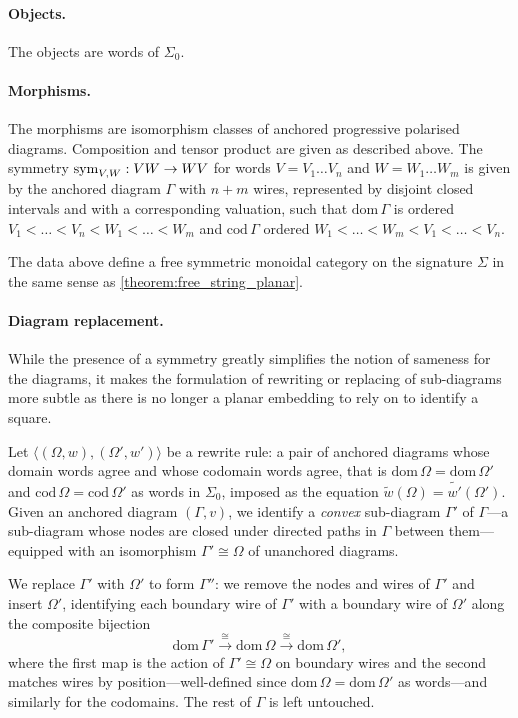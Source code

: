\paragraph{Objects.} The objects are words of $\Sigma_0$.
\paragraph{Morphisms.} The morphisms are isomorphism classes of anchored progressive polarised diagrams.
Composition and tensor product are given as described above.
The symmetry $\operatorname{sym}_{V,W} : VW \to WV$ for words $V = V_1 \ldots V_n$ and $W = W_1 \ldots W_m$ is given by the anchored diagram $\Gamma$ with $n + m$ wires, represented by disjoint closed intervals and with a corresponding valuation, such that $\mathrm{dom}\,\Gamma$ is ordered $V_1 < \ldots < V_n < W_1 < \ldots < W_m$ and $\mathrm{cod}\,\Gamma$ ordered $W_1 < \ldots < W_m < V_1 < \ldots < V_n$.
\begin{theorem}
The data above define a free symmetric monoidal category on the signature $\Sigma$ in the same sense as \cref{theorem:free_string_planar}.
\end{theorem}

\paragraph{Diagram replacement.}
While the presence of a symmetry greatly simplifies the notion of sameness for the diagrams, it makes the formulation of rewriting or replacing of sub-diagrams more subtle as there is no longer a planar embedding to rely on to identify a square.
    
Let $\langle (\Omega, w), (\Omega', w') \rangle$ be a rewrite rule: a pair of
anchored diagrams whose domain words agree and whose codomain words agree, that
is $\mathrm{dom}\,\Omega = \mathrm{dom}\,\Omega'$ and
$\mathrm{cod}\,\Omega = \mathrm{cod}\,\Omega'$ as words in $\Sigma_0$, imposed as
the equation $\widetilde{w}(\Omega) = \widetilde{w'}(\Omega')$. Given an anchored
diagram $(\Gamma, v)$, we identify a \emph{convex} sub-diagram $\Gamma'$ of
$\Gamma$---a sub-diagram whose nodes are closed under directed paths in
$\Gamma$ between them---equipped with an isomorphism $\Gamma' \cong \Omega$ of
unanchored diagrams.

We replace $\Gamma'$ with $\Omega'$ to form $\Gamma''$: we remove the nodes and
wires of $\Gamma'$ and insert $\Omega'$, identifying each boundary wire of
$\Gamma'$ with a boundary wire of $\Omega'$ along the composite bijection
\[
  \mathrm{dom}\,\Gamma' \xrightarrow{\ \cong\ } \mathrm{dom}\,\Omega
  \xrightarrow{\ \cong\ } \mathrm{dom}\,\Omega',
\]
where the first map is the action of $\Gamma' \cong \Omega$ on boundary wires and
the second matches wires by position---well-defined since
$\mathrm{dom}\,\Omega = \mathrm{dom}\,\Omega'$ as words---and similarly for the
codomains. The rest of $\Gamma$ is left untouched.

